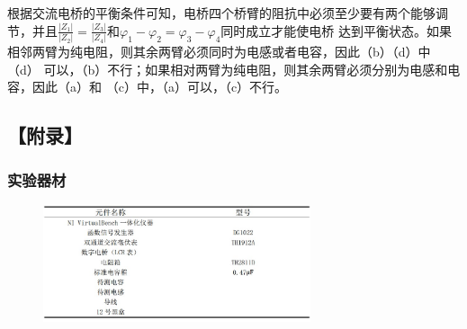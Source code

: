 \documentclass[10pt,a4paper,twocolumn,twoside,UTF8]{ctexart}
\begin{document}
根据交流电桥的平衡条件可知，电桥四个桥臂的阻抗中必须至少要有两个能够调节，并且$\frac{|Z_1|}{|Z_2|}=\frac{|Z_3|}{|Z_4|}$和$\varphi_1-\varphi_2=\varphi_3-\varphi_4$同时成立才能使电桥
达到平衡状态。如果相邻两臂为纯电阻，则其余两臂必须同时为电感或者电容，因此（b）（d）中（d） 可以，（b）不行；如果相对两臂为纯电阻，则其余两臂必须分别为电感和电容，因此（a）和
（c）中，（a）可以，（c）不行。




\clearpage
	\subsection*{【附录】}
	\subsubsection*{实验器材}
	\begin{figure}[!h]
		\centering
		\includegraphics[width=0.7\textwidth]{img//device.jpg}
		\label{fig:device}
	\end{figure}


\end{document}
